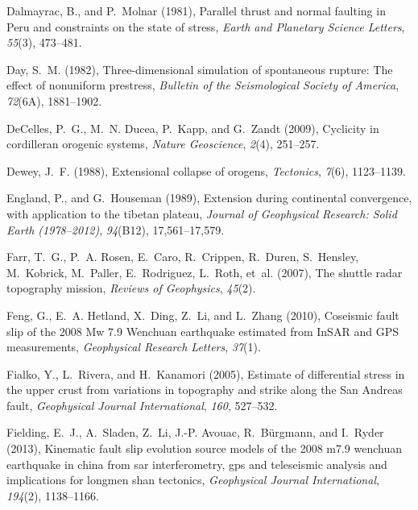 \documentclass[draft,jgrga]{AGUTeX}
\begin{document}
\begin{article}
\begin{thebibliography}{90}
Dalmayrac, B., and P.~Molnar (1981), Parallel thrust and normal faulting in
  {P}eru and constraints on the state of stress, \textit{Earth and Planetary
  Science Letters}, \textit{55}(3), 473--481.

Day, S.~M. (1982), Three-dimensional simulation of spontaneous rupture: {T}he
  effect of nonuniform prestress, \textit{Bulletin of the Seismological Society
  of America}, \textit{72}(6A), 1881--1902.

DeCelles, P.~G., M.~N. Ducea, P.~Kapp, and G.~Zandt (2009), Cyclicity in
  cordilleran orogenic systems, \textit{Nature Geoscience}, \textit{2}(4),
  251--257.

Dewey, J.~F. (1988), Extensional collapse of orogens, \textit{Tectonics},
  \textit{7}(6), 1123--1139.

England, P., and G.~Houseman (1989), Extension during continental convergence,
  with application to the tibetan plateau, \textit{Journal of Geophysical
  Research: Solid Earth (1978--2012)}, \textit{94}(B12), 17,561--17,579.

Farr, T.~G., P.~A. Rosen, E.~Caro, R.~Crippen, R.~Duren, S.~Hensley,
  M.~Kobrick, M.~Paller, E.~Rodriguez, L.~Roth, et~al. (2007), The shuttle
  radar topography mission, \textit{Reviews of Geophysics}, \textit{45}(2).

Feng, G., E.~A. Hetland, X.~Ding, Z.~Li, and L.~Zhang (2010), Coseismic fault
  slip of the 2008 {M}w 7.9 {W}enchuan earthquake estimated from {I}n{S}{A}{R}
  and {G}{P}{S} measurements, \textit{Geophysical Research Letters},
  \textit{37}(1).

Fialko, Y., L.~Rivera, and H.~Kanamori (2005), Estimate of differential stress
  in the upper crust from variations in topography and strike along the San
  Andreas fault, \textit{Geophysical Journal International}, \textit{160},
  527--532.

Fielding, E.~J., A.~Sladen, Z.~Li, J.-P. Avouac, R.~B{\"u}rgmann, and I.~Ryder
  (2013), Kinematic fault slip evolution source models of the 2008 m7.9
  wenchuan earthquake in china from sar interferometry, gps and teleseismic
  analysis and implications for longmen shan tectonics, \textit{Geophysical
  Journal International}, \textit{194}(2), 1138--1166.


\end{thebibliography}
\end{article}
\end{document}
